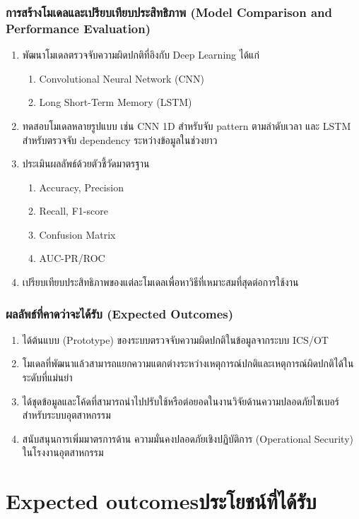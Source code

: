 \subsubsection{การสร้างโมเดลและเปรียบเทียบประสิทธิภาพ (Model Comparison and Performance Evaluation)}
\begin{enumerate}
    \item พัฒนาโมเดลตรวจจับความผิดปกติที่อิงกับ Deep Learning ได้แก่ 
    \begin{enumerate}
        \item Convolutional Neural Network (CNN)
        \item  Long Short-Term Memory (LSTM)
    \end{enumerate}
    \item ทดสอบโมเดลหลายรูปแบบ เช่น CNN 1D สำหรับจับ pattern ตามลำดับเวลา และ LSTM สำหรับตรวจจับ dependency ระหว่างข้อมูลในช่วงยาว
    \item ประเมินผลลัพธ์ด้วยตัวชี้วัดมาตรฐาน
    \begin{enumerate}
        \item Accuracy, Precision
        \item Recall, F1-score
        \item Confusion Matrix 
        \item AUC-PR/ROC
    \end{enumerate}
    \item เปรียบเทียบประสิทธิภาพของแต่ละโมเดลเพื่อหาวิธีที่เหมาะสมที่สุดต่อการใช้งาน
\end{enumerate}

\subsubsection{ผลลัพธ์ที่คาดว่าจะได้รับ (Expected Outcomes)}
\begin{enumerate}
    \item ได้ต้นแบบ (Prototype) ของระบบตรวจจับความผิดปกติในข้อมูลจากระบบ ICS/OT
    \item โมเดลที่พัฒนาแล้วสามารถแยกความแตกต่างระหว่างเหตุการณ์ปกติและเหตุการณ์ผิดปกติได้ในระดับที่แม่นยำ
    \item ได้ชุดข้อมูลและโค้ดที่สามารถนำไปปรับใช้หรือต่อยอดในงานวิจัยด้านความปลอดภัยไซเบอร์ \\ สำหรับระบบอุตสาหกรรม
    \item สนับสนุนการเพิ่มมาตรการด้าน ความมั่นคงปลอดภัยเชิงปฏิบัติการ (Operational Security) ในโรงงานอุตสาหกรรม
\end{enumerate}

\section{\ifenglish Expected outcomes\else ประโยชน์ที่ได้รับ\fi}


